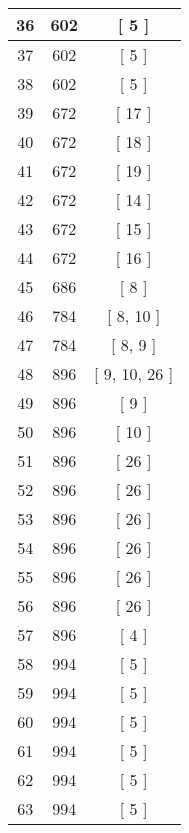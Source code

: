 \begin{center}
\begin{longtable}[H]{|| c c c ||}
36 & 602 & [ 5 ] \\ 
\hline
37 & 602 & [ 5 ] \\ 
\hline
38 & 602 & [ 5 ] \\ 
\hline
39 & 672 & [ 17 ] \\ 
\hline
40 & 672 & [ 18 ] \\ 
\hline
41 & 672 & [ 19 ] \\ 
\hline
42 & 672 & [ 14 ] \\ 
\hline
43 & 672 & [ 15 ] \\ 
\hline
44 & 672 & [ 16 ] \\ 
\hline
45 & 686 & [ 8 ] \\ 
\hline
46 & 784 & [ 8, 10 ] \\ 
\hline
47 & 784 & [ 8, 9 ] \\ 
\hline
48 & 896 & [ 9, 10, 26 ] \\ 
\hline
49 & 896 & [ 9 ] \\ 
\hline
50 & 896 & [ 10 ] \\ 
\hline
51 & 896 & [ 26 ] \\ 
\hline
52 & 896 & [ 26 ] \\ 
\hline
53 & 896 & [ 26 ] \\ 
\hline
54 & 896 & [ 26 ] \\ 
\hline
55 & 896 & [ 26 ] \\ 
\hline
56 & 896 & [ 26 ] \\ 
\hline
57 & 896 & [ 4 ] \\ 
\hline
58 & 994 & [ 5 ] \\ 
\hline
59 & 994 & [ 5 ] \\ 
\hline
60 & 994 & [ 5 ] \\ 
\hline
61 & 994 & [ 5 ] \\ 
\hline
62 & 994 & [ 5 ] \\ 
\hline
63 & 994 & [ 5 ] \\ 
\hline
\end{longtable}
\end{center}
